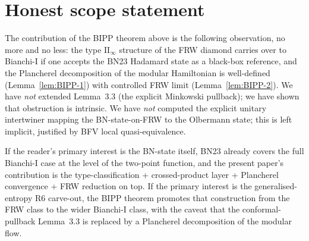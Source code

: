 \documentclass[11pt,a4paper]{article}
\theoremstyle{definition}
\begin{document}
\section{Honest scope statement}\label{sec:scope}

The contribution of the BIPP theorem above is the following observation,
no more and no less: the type $\mathrm{II}_\infty$ structure of the FRW
diamond carries over to Bianchi-I if one accepts the BN23 Hadamard state
as a black-box reference, and the Plancherel decomposition of the
modular Hamiltonian is well-defined (Lemma~\ref{lem:BIPP-1}) with
controlled FRW limit (Lemma~\ref{lem:BIPP-2}). We have \emph{not}
extended Lemma~3.3 (the explicit Minkowski pullback); we have shown that
obstruction is intrinsic. We have \emph{not} computed the explicit
unitary intertwiner mapping the BN-state-on-FRW to the Olbermann state;
this is left implicit, justified by BFV local quasi-equivalence.

If the reader's primary interest is the BN-state itself, BN23 already
covers the full Bianchi-I case at the level of the two-point function,
and the present paper's contribution is the type-classification +
crossed-product layer + Plancherel convergence + FRW reduction on top.
If the primary interest is the generalised-entropy R6 carve-out, the
BIPP theorem promotes that construction from the FRW class to the wider
Bianchi-I class, with the caveat that the conformal-pullback Lemma~3.3
is replaced by a Plancherel decomposition of the modular flow.
\end{document}
